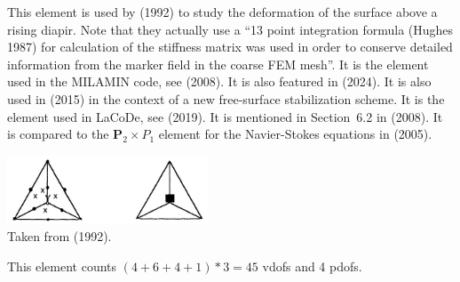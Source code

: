 This element is used by \textcite{popo92} (1992) to study the deformation of 
the surface above a rising diapir. Note that they actually use a 
{\color{darkgray} ``13 point integration formula (Hughes 1987) for calculation of the stiffness matrix was 
used in order to conserve detailed information from the marker field in the coarse FEM mesh''}. 
It is the element used in the MILAMIN code, see \textcite{daks08} (2008).
It is also featured in \textcite{thba24} (2024).
It is also used in \textcite{anmp15} (2015) in the context of a new free-surface stabilization scheme. 
It is the element used in LaCoDe, see \textcite{demh19} (2019).
It is mentioned in Section~6.2 in \textcite{bobf08} (2008).
It is compared to the ${\bm P}_2\times P_1$ element for the Navier-Stokes equations in 
\textcite{krba05} (2005).

\begin{center}
\includegraphics[width=6cm]{images/pair_cr/cr}\\
{\captionfont Taken from \textcite{begt92} (1992).}
\end{center}

This element counts $(4+6+4+1)*3=45$ vdofs and 4 pdofs.

